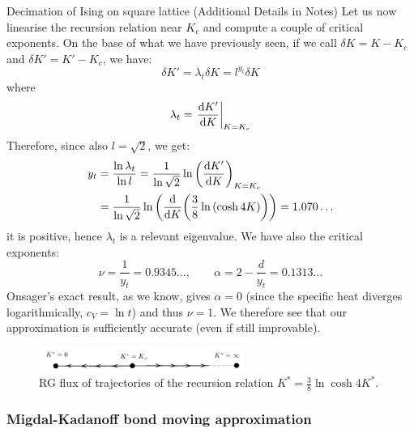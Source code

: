 \documentclass[../../Main/Main.tex]{subfiles}
\begin{document}
\begin{example}{Decimation of Ising on square lattice (Additional Details in Notes)}{}
Let us now linearise the recursion relation near \( K_c \) and compute a couple of critical exponents.
On the base of what we have previously seen, if we call \( \delta K = K - K_c \) and \( \delta K' = K' - K_c \), we have:
\begin{equation*}
  \delta K' = \lambda _t \delta K = l^{y _t} \delta K
\end{equation*}
where
\begin{equation*}
  \lambda _t = \eval{\dv{K'}{K} }_{K=K_c}
\end{equation*}
Therefore, since also \( l = \sqrt{2}  \), we get:
\begin{equation*}
\begin{split}
y_t  &= \frac{\ln{\lambda _t} }{\ln{l} } = \frac{1}{\ln{\sqrt{2} } } \ln{\qty(\dv{K'}{K})_{K=K_c} }   \\
& = \frac{1}{\ln{\sqrt{2} } }  \ln{\qty(\dv{}{K} \qty(\frac{3}{8} \ln{(\cosh 4K)} ) ) } = 1.070\dots
\end{split}
\end{equation*}
it is positive, hence \( \lambda _t \)  is a relevant eigenvalue.
We have also the critical exponents:
\begin{equation*}
  \nu = \frac{1}{y_t} = 0.9345\dots, \qquad \alpha = 2 - \frac{d}{y_t} = 0.1313\dots
\end{equation*}
Onsager's exact result, as we know, gives \( \alpha =0 \) (since the specific heat diverges logarithmically, \( c_V = \ln t \)) and thus \( \nu =1 \). We therefore see that our approximation is sufficiently accurate (even if still improvable).

\end{example}



\begin{figure}[H]
\centering
\includegraphics[width=0.6\textwidth]{./img/9.pdf}
\caption{\label{fig:20_8} RG flux of trajectories of the recursion relation \(   K^* = \frac{3}{8} \ln{\cosh 4 K^*} \). }
\end{figure}



\subsubsection{Migdal-Kadanoff bond moving approximation}
\end{document}
